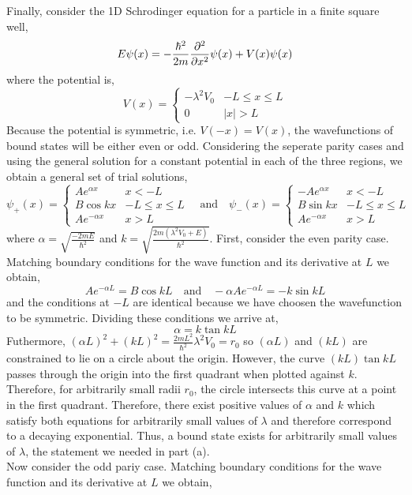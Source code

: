 \documentclass[12pt]{extarticle}
\begin{document}
Finally, consider the 1D Schrodinger equation for a particle in a finite square well,
\[ E \psi(x) = - \frac{\hbar^2}{2m} \frac{\partial^2{}}{\partial{x}^2} \psi(x) +  V(x) \psi(x) \] 
where the potential is,
\[V(x) = \begin{cases}
-\lambda^2 V_0 & -L \le x \le L \\
0 & |x| > L
\end{cases}\] 
Because the potential is symmetric, i.e. $V(-x) = V(x)$, the wavefunctions of bound states will be either even or odd. Considering the seperate parity cases and using the general solution for a constant potential in each of the three regions, we obtain a general set of trial solutions,
\[ \psi_{+}(x) = \begin{cases}
A e^{\alpha x} & x < -L \\
B \cos{kx} &  -L \le x \le L \\
A e^{-\alpha x} & x > L
\end{cases} \quad \text{and} \quad \psi_{-}(x) = \begin{cases}
-A e^{\alpha x} & x < -L \\
B \sin{kx} &  -L \le x \le L \\
A e^{-\alpha x} & x > L
\end{cases} \] 
where $\alpha = \sqrt{\frac{-2mE}{\hbar^2}}$ and $k = \sqrt{\frac{2m(\lambda^2 V_0 + E)}{\hbar^2}}$. 
First, consider the even parity case. Matching boundary conditions for the wave function and its derivative at $L$ we obtain, 
\[ A e^{-\alpha L} = B \cos{k L} \quad \text{and} \quad -\alpha A e^{-\alpha L} = - k \sin{k L} \]
and the conditions at $-L$ are identical because we have choosen the wavefunction to be symmetric. Dividing these conditions we arrive at,
\[ \alpha = k \tan{kL} \] 
Futhermore, $(\alpha L)^2 + (kL)^2 = \frac{2m L^2}{\hbar^2} \lambda^2 V_0 = r_0$ so $(
\alpha L)$ and $(k L)$ are constrained to lie on a circle about the origin. However, the curve $(k L) \tan{k L}$ passes through the origin into the first quadrant when plotted against $k$. Therefore, for arbitrarily small radii $r_0$, the circle intersects this curve at a point in the first quadrant. Therefore, there exist positive values of $\alpha$ and $k$ which satisfy both equations for arbitrarily small values of $\lambda$ and therefore correspond to a decaying exponential. Thus, a bound state exists for arbitrarily small values of $\lambda$, the statement we needed in part (a). \bigskip \\
Now consider the odd pariy case. Matching boundary conditions for the wave function and its derivative at $L$ we obtain, 
\end{document}
